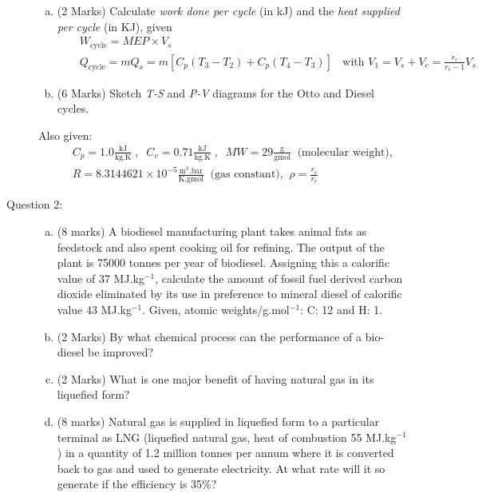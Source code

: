 \documentclass[12pt,twoside]{report}
\newcommand{\frc}{\displaystyle\frac}
\begin{document}
\begin{description}
\begin{enumerate}[(a)]
\item (2 Marks) Calculate {\it work done per cycle} (in kJ) and the {\it heat supplied per cycle} (in KJ), given
\begin{eqnarray}
&& W_{\text{cycle}} = MEP \times V_{s} \nonumber\\
&& Q_{\text{cycle}} = m Q_{s} = m \left[ C_{p}\left(T_{3}-T_{2}\right) + C_{p}\left(T_{4}-T_{3}\right)\right] \;\;\text{ with } V_{1}=V_{s}+V_{c}=\frc{r_{c}}{r_{c}-1}V_{s} \nonumber
\end{eqnarray}

\item (6 Marks) Sketch {\it T-S} and {\it P-V} diagrams for the Otto and Diesel cycles.
%
\end{enumerate}

Also given: 
\begin{eqnarray}
&& C_{p}=1.0\frc{\text{kJ}}{\text{kg.K}}\;,\;\;C_{v}=0.71\frc{\text{kJ}}{\text{kg.K}}\;, \;\; MW=29 \frc{\text{g}}{\text{gmol}}\;\; \text{(molecular weight),} \nonumber \\
&& R=8.3144621\times 10^{-5}\frc{\text{m}^{3}.\text{bar}}{\text{K.gmol}}\;\;\text{(gas constant),}\;\; \rho = \frc{r_{c}}{r_{e}} \nonumber 
\end{eqnarray}

\clearpage

\item [Question 2:]  \mbox{}
\begin{enumerate}[(a)]
\item (8 marks) A biodiesel manufacturing plant takes animal fats as feedstock and also spent cooking oil for refining. The output of the plant is 75000 tonnes per year of biodiesel.  Assigning this a calorific value of 37 MJ.kg$^{-1}$, calculate the amount of fossil fuel derived carbon dioxide eliminated by its use in preference to mineral diesel of calorific value 43 MJ.kg$^{-1}$. Given, atomic weights/g.mol$^{-1}$: C: 12 and H: 1.

\item (2 Marks) By what chemical process can the performance of a bio-diesel be improved?

\item (2 Marks) What is one major benefit of having natural gas in its liquefied form?

\item (8 marks) Natural gas is supplied in liquefied form to a particular terminal as LNG (liquefied natural gas, heat of combustion 55 MJ.kg$^{-1}$) in a quantity of 1.2 million tonnes per annum where it is converted back to gas and used to generate electricity. At what rate will it so generate if the efficiency is 35$\%$?
\end{enumerate} 



\end{description}
\end{document}
